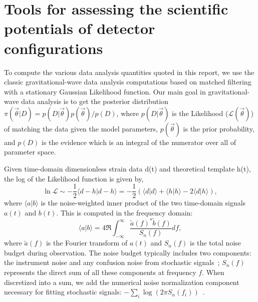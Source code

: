 \chapter{Tools for assessing the scientific potentials of detector configurations \label{ch:data_analysis}}

To compute the various data analysis quantities quoted in this report, we use the classic gravitational-wave data analysis computations based on matched filtering with a stationary Gaussian Likelihood function. Our main goal in gravitational-wave data analysis is to get the posterior distribution $\pi(\vec{\theta}|D)=p(D|\vec{\theta})p(\vec{\theta})/p(D)$, where $p(D|\vec{\theta})$ is the Likelihood ($\mathcal{L}(\vec{\theta})$) of matching the data given the model parameters, $p(\vec{\theta})$ is the prior probability, and $p(D)$ is the evidence which is an integral of the numerator over all of parameter space. 

Given time-domain dimensionless strain data d(t) and theoretical template h(t), the log of the Likelihood function is given by,
\begin{equation}\label{eq:log_like}
    \ln{\mathcal{L}\sim-\frac{1}{2}\langle d - h | d-h\rangle=-\frac{1}{2}\left(\langle d|d\rangle + \langle h|h\rangle - 2 \langle d|h\rangle\right)},
\end{equation}
where $\langle a | b \rangle$ is the noise-weighted inner product of the two time-domain signals $a(t)$ and $b(t)$. This is computed in the frequency domain:
\begin{equation}\label{eq:inner_product}
    \langle a|b \rangle = 4\Re \int_{-\infty}^\infty \frac{\tilde{a}(f)^*\tilde{b}(f)}{S_n(f)}df,
\end{equation}
where $\tilde{a}(f)$ is the Fourier transform of $a(t)$ and $S_n(f)$ is the total noise budget during observation. The noise budget typically includes two components: the instrument noise and any confusion noise from stochastic signals~\cite{Robson:2018ifk,Karnesis:2021tsh}; $S_n(f)$ represents the direct sum of all these components at frequency $f$. When discretized into a sum, we add the numerical noise normalization component necessary for fitting stochastic signals: $-\sum_i\log{(2\pi S_n(f_i))}$~\cite{Katz:2024oqg}.

